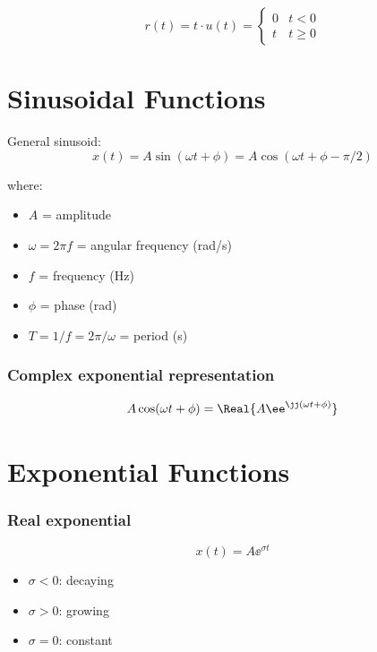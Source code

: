 \begin{equation}
r(t) = t \cdot u(t) = \begin{cases} 0 & t < 0 \\ t & t \geq 0 \end{cases}
\end{equation}

\section{Sinusoidal Functions}

General sinusoid:
\begin{equation}
x(t) = A\sin(\omega t + \phi) = A\cos(\omega t + \phi - \pi/2)
\end{equation}

where:
\begin{itemize}
    \item $A$ = amplitude
    \item $\omega = 2\pi f$ = angular frequency (rad/s)
    \item $f$ = frequency (Hz)
    \item $\phi$ = phase (rad)
    \item $T = 1/f = 2\pi/\omega$ = period (s)
\end{itemize}

\subsubsection{Complex exponential representation}
\begin{equation}
A\cos(\omega t + \phi) = \Real\{A\ee^{\jj(\omega t + \phi)}\}
\end{equation}

\section{Exponential Functions}

\subsubsection{Real exponential}
\begin{equation}
x(t) = A\ee^{\sigma t}
\end{equation}
\begin{itemize}
    \item $\sigma < 0$: decaying
    \item $\sigma > 0$: growing
    \item $\sigma = 0$: constant
\end{itemize}

